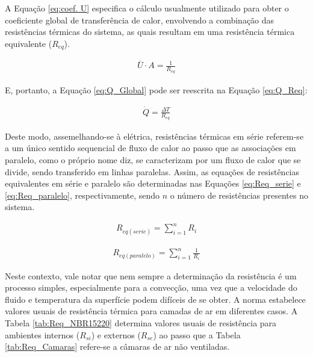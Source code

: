 \documentclass[acronym,symbols,table]{fei}
\begin{document}
A Equação \ref{eq:coef. U} especifica o cálculo usualmente utilizado para obter o coeficiente global de transferência de calor, envolvendo a combinação das resistências térmicas do sistema, as quais resultam em uma resistência térmica equivalente ($R_{eq}$).

\begin{equation} \label{eq:coef. U}
\begin{aligned}
    \overline{U} \cdot A=\frac{1}{R_{eq}}
\end{aligned}
\end{equation}

E, portanto, a Equação \ref{eq:Q_Global} pode ser reescrita na Equação \ref{eq:Q_Req}:

\begin{equation} \label{eq:Q_Req}
\begin{aligned}
    \dot{Q}=\frac{\Delta T}{R_{eq}}
\end{aligned}
\end{equation}

Deste modo,  assemelhando-se à elétrica, resistências térmicas em série referem-se a um único sentido sequencial de fluxo de calor ao passo que as associações em paralelo, como o próprio nome diz, se caracterizam por um fluxo de calor que se divide, sendo transferido em linhas paralelas. Assim, as equações de resistências equivalentes em série e paralelo são determinadas nas Equações \ref{eq:Req_serie} e \ref{eq:Req_paralelo}, respectivamente, sendo $n$ o número de resistências presentes no sistema.

\begin{equation} \label{eq:Req_serie}
\begin{aligned}
    {R}_{eq(serie)}=\sum^{n}_{i=1}{R_{i}}
\end{aligned}
\end{equation}

\begin{equation} \label{eq:Req_paralelo}
\begin{aligned}
    {R}_{eq(paralelo)}=\sum^{n}_{i=1}{\frac{1}{R_{i}}}
\end{aligned}
\end{equation}

Neste contexto, vale notar que nem sempre a determinação da resistência é um processo simples, especialmente para a convecção, uma vez que a velocidade do fluido e temperatura da superfície podem difíceis de se obter. A norma \cite{abnt15220} estabelece valores usuais de resistência térmica para camadas de ar em diferentes casos. A Tabela \ref{tab:Req_NBR15220} determina valores usuais de resistência para ambientes internos ($R_{si}$) e externos ($R_{se}$) ao passo que a Tabela \ref{tab:Req_Camaras} refere-se a câmaras de ar não ventiladas.
\end{document}
